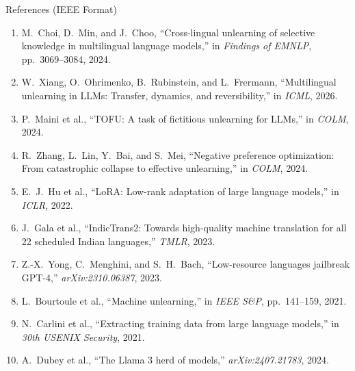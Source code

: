 \documentclass[aspectratio=169,10pt]{beamer}
\begin{document}
\begin{frame}{References (IEEE Format)}
  \scriptsize
  \begin{enumerate}
    \item M.~Choi, D.~Min, and J.~Choo, ``Cross-lingual unlearning of selective knowledge in multilingual language models,'' in \emph{Findings of EMNLP}, pp.~3069--3084, 2024.
    \item W.~Xiang, O.~Ohrimenko, B.~Rubinstein, and L.~Frermann, ``Multilingual unlearning in LLMs: Transfer, dynamics, and reversibility,'' in \emph{ICML}, 2026.
    \item P.~Maini et al., ``TOFU: A task of fictitious unlearning for LLMs,'' in \emph{COLM}, 2024.
    \item R.~Zhang, L.~Lin, Y.~Bai, and S.~Mei, ``Negative preference optimization: From catastrophic collapse to effective unlearning,'' in \emph{COLM}, 2024.
    \item E.~J.~Hu et al., ``LoRA: Low-rank adaptation of large language models,'' in \emph{ICLR}, 2022.
    \item J.~Gala et al., ``IndicTrans2: Towards high-quality machine translation for all 22 scheduled Indian languages,'' \emph{TMLR}, 2023.
    \item Z.-X.~Yong, C.~Menghini, and S.~H.~Bach, ``Low-resource languages jailbreak GPT-4,'' \emph{arXiv:2310.06387}, 2023.
    \item L.~Bourtoule et al., ``Machine unlearning,'' in \emph{IEEE S\&P}, pp.~141--159, 2021.
    \item N.~Carlini et al., ``Extracting training data from large language models,'' in \emph{30th USENIX Security}, 2021.
    \item A.~Dubey et al., ``The Llama 3 herd of models,'' \emph{arXiv:2407.21783}, 2024.
  \end{enumerate}
\end{frame}
\end{document}
